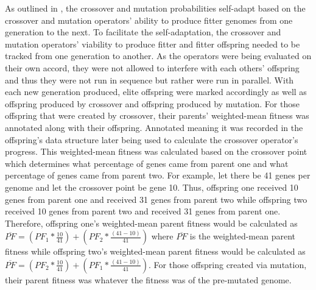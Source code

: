 As outlined in \cite{self_adapt}, the crossover and mutation probabilities self-adapt based on the crossover and mutation operators' ability to produce fitter genomes from one generation to the next. To facilitate the self-adaptation, the crossover and mutation operators' viability to produce fitter and fitter offspring needed to be tracked from one generation to another. As the operators were being evaluated on their own accord, they were not allowed to interfere with each others' offspring and thus they were not run in sequence but rather were run in parallel. With each new generation produced, elite offspring were marked accordingly as well as offspring produced by crossover and offspring produced by mutation. For those offspring that were created by crossover, their parents' weighted-mean fitness was annotated along with their offspring. Annotated meaning it was recorded in the offspring's data structure later being used to calculate the crossover operator's progress. This weighted-mean fitness was calculated based on the crossover point which determines what percentage of genes came from parent one and what percentage of genes came from parent two. For example, let there be 41 genes per genome and let the crossover point be gene 10. Thus, offspring one received 10 genes from parent one and received 31 genes from parent two while offspring two received 10 genes from parent two and received 31 genes from parent one. Therefore, offspring one's weighted-mean parent fitness would be calculated as $\overline{PF} = \left ( PF_1 * \frac{10}{41} \right ) + \left (PF_2 * \frac{(41-10)}{41} \right)$ where $\overline{PF}$ is the weighted-mean parent fitness while offspring two's weighted-mean parent fitness would be calculated as $\overline{PF} = \left ( PF_2 * \frac{10}{41} \right ) + \left (PF_1 * \frac{(41-10)}{41} \right)$. For those offspring created via mutation, their parent fitness was whatever the fitness was of the pre-mutated genome. 


